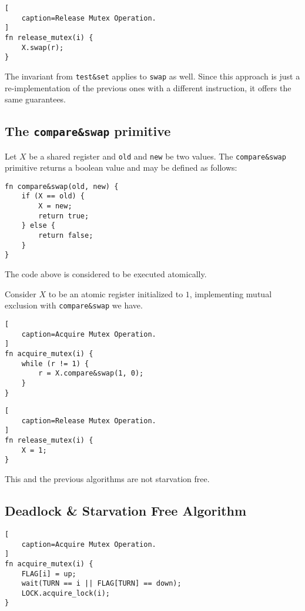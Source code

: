\begin{lstlisting}[
    caption=Release Mutex Operation.
]
fn release_mutex(i) {
    X.swap(r);
}
\end{lstlisting}

The invariant from \texttt{test\&set} applies to \texttt{swap} as well.
Since this approach is just a re-implementation of the previous ones with a different instruction,
it offers the same guarantees.

\subsection{The \texttt{compare\&swap} primitive}

Let $X$ be a shared register and \texttt{old} and \texttt{new} be two values.
The \texttt{compare\&swap} primitive returns a boolean value and may be defined as follows:

\begin{lstlisting}[caption=\texttt{compare\&swap} implementation.]
fn compare&swap(old, new) {
    if (X == old) {
        X = new;
        return true;
    } else {
        return false;
    }
}
\end{lstlisting}

The code above is considered to be executed atomically.

Consider $X$ to be an atomic register initialized to $1$,
implementing mutual exclusion with \texttt{compare\&swap} we have.

\begin{lstlisting}[
    caption=Acquire Mutex Operation.
]
fn acquire_mutex(i) {
    while (r != 1) {
        r = X.compare&swap(1, 0);
    }
}
\end{lstlisting}

\begin{lstlisting}[
    caption=Release Mutex Operation.
]
fn release_mutex(i) {
    X = 1;
}
\end{lstlisting}

This and the previous algorithms are not starvation free.

\subsection{Deadlock \& Starvation Free Algorithm}

\begin{lstlisting}[
    caption=Acquire Mutex Operation.
]
fn acquire_mutex(i) {
    FLAG[i] = up;
    wait(TURN == i || FLAG[TURN] == down);
    LOCK.acquire_lock(i);
}
\end{lstlisting}

